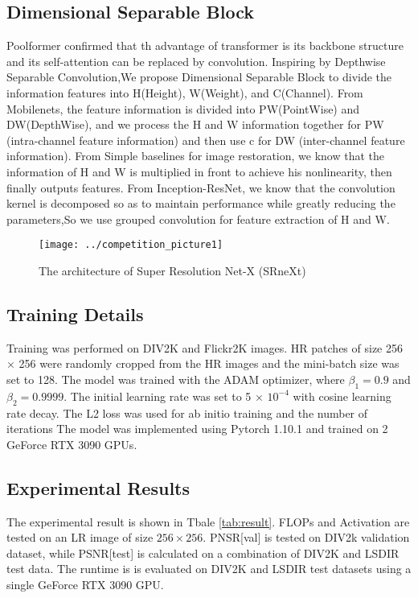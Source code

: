 \documentclass[10pt,twocolumn,letterpaper]{article}
\begin{document}
\subsection{Dimensional Separable Block}
Poolformer\cite{ref5} confirmed that th advantage of transformer is its backbone structure and its self-attention can be replaced by convolution.
Inspiring by Depthwise Separable Convolution\cite{ref6},We propose Dimensional Separable Block to divide the information features into H(Height), W(Weight), and C(Channel). 
From Mobilenets,\cite{ref7} the feature information is divided into PW(PointWise) and DW(DepthWise), and we process the H and W information together for PW (intra-channel feature information) and then use c for DW (inter-channel feature information). From Simple baselines for image restoration\cite{ref8}, we know that the information of H and W is multiplied in front to achieve his nonlinearity, then finally outputs features. From Inception-ResNet\cite{ref9}, we know that the convolution kernel is decomposed so as to maintain performance while greatly reducing the parameters,So we use grouped convolution for feature extraction of H and W.




\begin{figure}
	\centering
	\texttt{[image: ../competition\_picture1]}
	\caption{The architecture of Super Resolution Net-X (SRneXt)}
	\label{fig:competitionpicture1}
\end{figure}



 



\subsection{Training Details}
Training was performed on DIV2K \cite{ref10} and Flickr2K \cite{ref11} images. HR patches of size 256 × 256 were randomly cropped from the HR images and the mini-batch size was set to 128. The model was trained with the ADAM optimizer\cite{ref12}, where $\beta_1 =0.9$ and $\beta_2 =0.9999$. The initial learning rate was set to 5 × $10^{-4}$ with cosine learning rate decay. The L2 loss was used for ab initio training and the number of iterations The model was implemented using Pytorch 1.10.1 and trained on 2 GeForce RTX 3090 GPUs.


\subsection{Experimental Results}
The experimental result is shown in Tbale \ref{tab:result}. FLOPs and Activation are tested on an LR image of size $256\times 256$. PNSR[val] is tested on DIV2k validation dataset, while PSNR[test] is calculated on a combination of DIV2K and LSDIR test data. The runtime is is evaluated on DIV2K and LSDIR test datasets using a single GeForce RTX 3090 GPU. 
\end{document}
